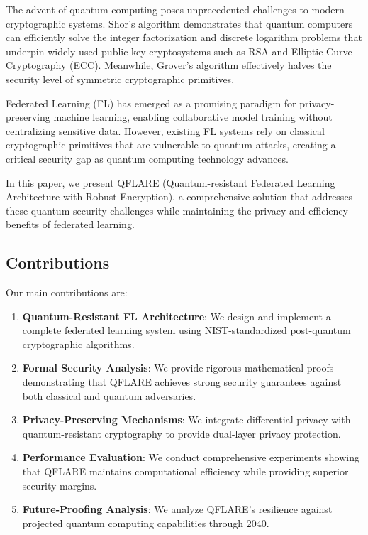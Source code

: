 \documentclass[journal]{IEEEtran}
\begin{document}
The advent of quantum computing poses unprecedented challenges to modern cryptographic systems. Shor's algorithm \cite{shor1994algorithms} demonstrates that quantum computers can efficiently solve the integer factorization and discrete logarithm problems that underpin widely-used public-key cryptosystems such as RSA and Elliptic Curve Cryptography (ECC). Meanwhile, Grover's algorithm \cite{grover1996fast} effectively halves the security level of symmetric cryptographic primitives.

Federated Learning (FL) \cite{mcmahan2017communication} has emerged as a promising paradigm for privacy-preserving machine learning, enabling collaborative model training without centralizing sensitive data. However, existing FL systems rely on classical cryptographic primitives that are vulnerable to quantum attacks, creating a critical security gap as quantum computing technology advances.

In this paper, we present QFLARE (Quantum-resistant Federated Learning Architecture with Robust Encryption), a comprehensive solution that addresses these quantum security challenges while maintaining the privacy and efficiency benefits of federated learning.

\subsection{Contributions}

Our main contributions are:

\begin{enumerate}
\item \textbf{Quantum-Resistant FL Architecture}: We design and implement a complete federated learning system using NIST-standardized post-quantum cryptographic algorithms.

\item \textbf{Formal Security Analysis}: We provide rigorous mathematical proofs demonstrating that QFLARE achieves strong security guarantees against both classical and quantum adversaries.

\item \textbf{Privacy-Preserving Mechanisms}: We integrate differential privacy with quantum-resistant cryptography to provide dual-layer privacy protection.

\item \textbf{Performance Evaluation}: We conduct comprehensive experiments showing that QFLARE maintains computational efficiency while providing superior security margins.

\item \textbf{Future-Proofing Analysis}: We analyze QFLARE's resilience against projected quantum computing capabilities through 2040.
\end{enumerate}
\end{document}
